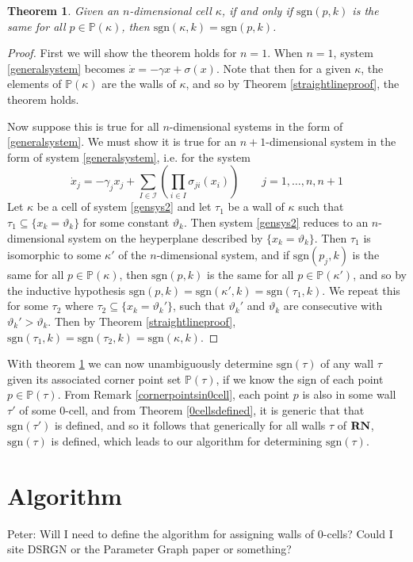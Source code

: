 \documentclass[12pt]{article}
\newtheorem{theorem}{Theorem}[section]
\theoremstyle{definition}
\theoremstyle{remark}
\newcommand\sgn{\text{sgn}}
\newcommand{\bbP}{\mathbb{P}}
\begin{document}
\begin{theorem} \label{cornerpointproof}
Given an $n$-dimensional cell $\kappa$, if and only if $\sgn(p,k)$ is the same for all $p\in \bbP (\kappa)$,  then $\sgn(\kappa,k)=\sgn(p,k)$. 
\end{theorem}

\begin{proof}
First we will show the theorem holds for $n=1$. When $n=1$, system \eqref{generalsystem} becomes $\dot{x}=-\gamma x + \sigma(x)$. Note that then for a given $\kappa$, the elements of $\bbP(\kappa)$ are the walls of $\kappa$, and so by Theorem \ref{straightlineproof}, the theorem holds.

Now suppose this is true for all $n$-dimensional systems in the form of \eqref{generalsystem}. We must show it is true for an $n+1$-dimensional system in the form of system \eqref{generalsystem}, i.e. for the system
\begin{equation} \label{gensys2}
\dot{x}_j=-\gamma_j x_j + \sum_{I\in \mathcal{I}}\left(\prod_{i\in I}\sigma_{ji}(x_i)\right)	\qquad	j=1,\dots,n,n+1
\end{equation}
Let $\kappa$ be a cell of system \eqref{gensys2} and let $\tau_1$ be a wall of $\kappa$ such that $\tau_1 \subseteq \{x_k=\vartheta_k\}$ for some constant $\vartheta_k$. Then system \eqref{gensys2} reduces to an $n$-dimensional system on the heyperplane described by $\{x_k=\vartheta_k\}$. Then $\tau_1$ is isomorphic to some $\kappa'$ of the $n$-dimensional system, and if $\sgn(p_j,k)$ is the same for all $p\in \bbP (\kappa)$, then $\sgn(p,k)$ is the same for all $p\in \bbP (\kappa')$, and so by the inductive hypothesis $\sgn(p,k)=\sgn(\kappa',k)=\sgn(\tau_1,k)$. We repeat this for some $\tau_2$ where $\tau_2 \subseteq \{x_k=\vartheta_k'\}$, such that $\vartheta_k'$ and $\vartheta_k$ are consecutive with $\vartheta_k' > \vartheta_k$. Then by Theorem \ref{straightlineproof}, $\sgn(\tau_1,k)=\sgn(\tau_2,k)=\sgn(\kappa,k)$.
\end{proof}

With theorem \ref{cornerpointproof} we can now unambiguously determine $\sgn(\tau)$ of any wall $\tau$ given its associated corner point set $\bbP(\tau)$, if we know the sign of each point $p\in\bbP(\tau)$. From Remark \ref{cornerpointsin0cell}, each point $p$ is also in some wall $\tau'$ of some $0$-cell, and from Theorem \ref{0cellsdefined}, it is generic that that $\sgn(\tau')$ is defined, and so it follows that generically for all walls $\tau$ of $\textnormal{\textbf{RN}}$,  $\sgn(\tau)$ is defined, which leads to our algorithm for determining $\sgn(\tau)$. 

\section{Algorithm}
{\color{cyan} Peter: Will I need to define the algorithm for assigning walls of 0-cells? Could I site DSRGN or the Parameter Graph paper or something?}
\end{document}
